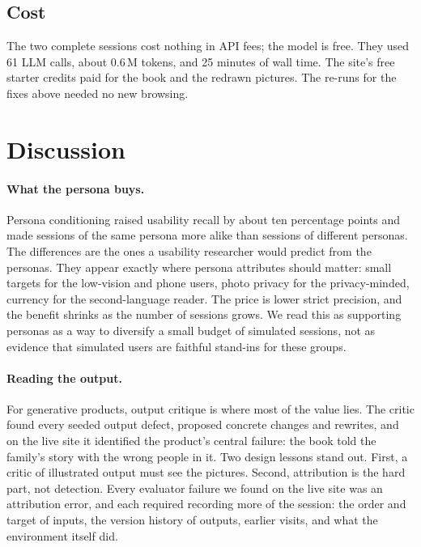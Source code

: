 \documentclass[10pt,twocolumn]{article}
\begin{document}
\subsection{Cost}

The two complete sessions cost nothing in API fees; the model is free. They used 61 LLM calls, about 0.6\,M tokens, and 25 minutes of wall time. The site's free starter credits paid for the book and the redrawn pictures. The re-runs for the fixes above needed no new browsing.

\section{Discussion}
\label{sec:discussion}

\paragraph{What the persona buys.} Persona conditioning raised usability recall by about ten percentage points and made sessions of the same persona more alike than sessions of different personas. The differences are the ones a usability researcher would predict from the personas. They appear exactly where persona attributes should matter: small targets for the low-vision and phone users, photo privacy for the privacy-minded, currency for the second-language reader. The price is lower strict precision, and the benefit shrinks as the number of sessions grows. We read this as supporting personas as a way to diversify a small budget of simulated sessions, not as evidence that simulated users are faithful stand-ins for these groups.

\paragraph{Reading the output.} For generative products, output critique is where most of the value lies. The critic found every seeded output defect, proposed concrete changes and rewrites, and on the live site it identified the product's central failure: the book told the family's story with the wrong people in it. Two design lessons stand out. First, a critic of illustrated output must see the pictures. Second, attribution is the hard part, not detection. Every evaluator failure we found on the live site was an attribution error, and each required recording more of the session: the order and target of inputs, the version history of outputs, earlier visits, and what the environment itself did.
\end{document}
